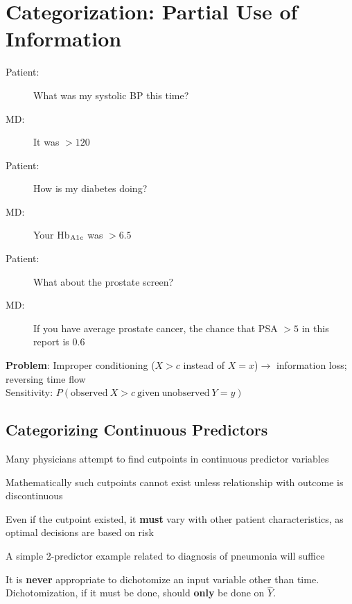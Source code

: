 \section{Categorization: Partial Use of Information}
\begin{description}
\item[Patient:] What was my systolic BP this time?
\item[MD:] It was $> 120$
\item[Patient:] How is my diabetes doing?
\item[MD:] Your Hb$_{\textrm A1c}$ was $> 6.5$
\item[Patient:] What about the prostate screen?
\item[MD:] If you have average prostate cancer, the chance that PSA $> 5$ in this report is $0.6$
\end{description}
\textbf{Problem}: Improper conditioning ($X > c$ instead of $X =
x$)$\rightarrow$ information loss; reversing time flow\\ Sensitivity: $P(\mathrm{observed~} X > c \mathrm{~given~unobserved~} Y=y)$

\subsection{Categorizing Continuous Predictors}%
\bi
\item Many physicians attempt to find cutpoints in continuous
  predictor variables
\item Mathematically such cutpoints cannot exist unless relationship
  with outcome is discontinuous
\item Even if the cutpoint existed, it \textbf{must} vary with other patient
  characteristics, as optimal decisions are based on risk
\item A simple 2-predictor example related to diagnosis of pneumonia
  will suffice
\item It is \textbf{never} appropriate to dichotomize an input
  variable other than time.  Dichotomization, if it must be done,
  should \textbf{only} be done on $\hat{Y}$.
\ei

